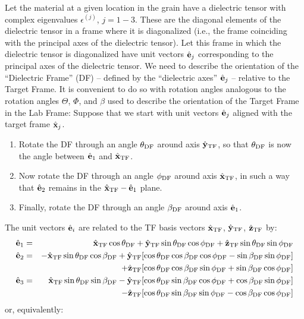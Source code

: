Let the material at a given location in the grain have a dielectric
tensor 
with complex eigenvalues $\epsilon^{(j)}$, $j=1-3$.  These are the
diagonal elements of the dielectric tensor in a frame where it is diagonalized
(i.e., the frame coinciding with the principal axes of the dielectric tensor).
Let this frame in which the dielectric tensor is diagonalized have
unit vectors $\hat{\bf e}_j$ corresponding to the principal axes of
the dielectric tensor.
We need to describe the orientation of the 
``Dielectric Frame'' (DF)
-- defined by the ``dielectric axes'' $\hat{\bf e}_j$ --
relative to the Target Frame.
It is convenient to do so with rotation angles analogous to the rotation
angles $\Theta$, $\Phi$, and $\beta$ used
to describe the orientation of the Target Frame in the Lab Frame:
Suppose that we start with unit vectors $\hat{\bf e}_j$ aligned with the
target frame $\hat{\bf x}_j$.
\begin{enumerate}
\index{$\Theta_\DF$}
\item Rotate the DF through an angle $\theta_{\rm DF}$ 
around axis $\hat{\bf y}_{\rm TF}$,
so that $\theta_{\rm DF}$ is now the angle between $\hat{\bf e}_1$ and
$\hat{\bf x}_{\rm TF}$.
\index{$\Phi_\DF$}
\item Now rotate the DF through an angle $\phi_{\rm DF}$ 
around axis $\hat{\bf x}_{\rm TF}$,
in such a way that $\hat{\bf e}_2$ remains in the $\hat{\bf x}_{\rm TF}-\hat{\bf e}_1$
plane.
\index{$\beta_\DF$}
\item Finally, rotate the DF through an angle $\beta_\DF$ around axis
$\hat{\bf e}_1$.
\end{enumerate}
The unit vectors $\hat{\bf e}_i$ are related to the TF basis vectors
$\hat{\bf x}_{\rm TF}$, $\hat{\bf y}_{\rm TF}$, $\hat{\bf z}_{\rm TF}$ by:
\begin{eqnarray}
{\hat{\bf e}}_1 &=&   \hat{\bf x}_{\rm TF} \cos\theta_{\rm DF}
+ \hat{\bf y}_{\rm TF} \sin\theta_{\rm DF} \cos\phi_{\rm DF}
+ \hat{\bf z}_{\rm TF} \sin\theta_{\rm DF} \sin\phi_{\rm DF}
	\\
{\hat{\bf e}}_2 &=& - \hat{\bf x}_{\rm TF} \sin\theta_{\rm DF} \cos\beta_{\rm DF}
+ \hat{\bf y}_{\rm TF} [\cos\theta_{\rm DF} \cos\beta_{\rm DF} \cos\phi_{\rm DF}-
\sin\beta_{\rm DF} \sin\phi_{\rm DF}] \nonumber\\
&&+ \hat{\bf z}_{\rm TF} [\cos\theta_{\rm DF} \cos\beta_{\rm DF} \sin\phi_{\rm DF}+
\sin\beta_{\rm DF} \cos\phi_{\rm DF}]
	\\
{\hat{\bf e}}_3 &=&   \hat{\bf x}_{\rm TF} \sin\theta_{\rm DF} \sin\beta_{\rm DF} 
- \hat{\bf y}_{\rm TF} [\cos\theta_{\rm DF} \sin\beta_{\rm DF} \cos\phi_{\rm DF}+
\cos\beta_{\rm DF} \sin\phi_{\rm DF}] \nonumber\\
  &&         - \hat{\bf z}_{\rm TF} [\cos\theta_{\rm DF} \sin\beta_{\rm DF} 
\sin\phi_{\rm DF}-\cos\beta_{\rm DF} \cos\phi_{\rm DF}]
\end{eqnarray}
or, equivalently:
